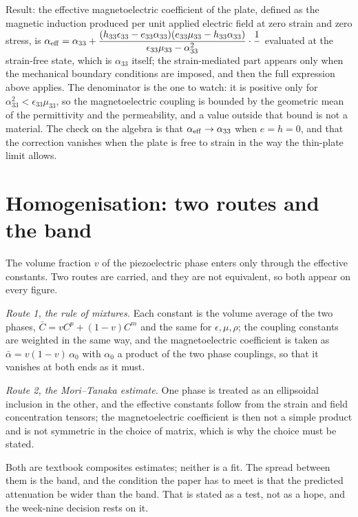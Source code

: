 \documentclass[11pt]{article}
\makeatletter
\newif\ifshowworked
\newenvironment{worked}{%
  \ifshowworked\par\smallskip\noindent\textit{Working.}\par\smallskip\else
  \setbox\z@\vbox\bgroup\fi}{\ifshowworked\par\smallskip\else\egroup\fi}
\makeatother
\begin{document}
\begin{worked}
Result: the effective magnetoelectric coefficient of the plate, defined as the magnetic induction produced
per unit applied electric field at zero strain and zero stress, is
$\alpha_{\rm eff}=\alpha_{33}+\dfrac{(h_{33}\epsilon_{33}-e_{33}\alpha_{33})(e_{33}\mu_{33}-h_{33}\alpha_{33})}
{\epsilon_{33}\mu_{33}-\alpha_{33}^2}\cdot\dfrac{1}{\ }$ evaluated at the strain-free state, which is
$\alpha_{33}$ itself; the strain-mediated part appears only when the mechanical boundary conditions are
imposed, and then the full expression above applies. The denominator is the one to watch: it is positive
only for $\alpha_{33}^2<\epsilon_{33}\mu_{33}$, so the magnetoelectric coupling is bounded by the
geometric mean of the permittivity and the permeability, and a value outside that bound is not a material.
The check on the algebra is that $\alpha_{\rm eff}\to\alpha_{33}$ when $e=h=0$, and that the correction
vanishes when the plate is free to strain in the way the thin-plate limit allows.
\end{worked}

\section{Homogenisation: two routes and the band}\label{sec:homog}

The volume fraction $v$ of the piezoelectric phase enters only through the effective constants. Two routes
are carried, and they are not equivalent, so both appear on every figure.

\emph{Route 1, the rule of mixtures.} Each constant is the volume average of the two phases,
$\bar C=vC^{p}+(1-v)C^{m}$ and the same for $\epsilon,\mu,\rho$; the coupling constants are weighted in the
same way, and the magnetoelectric coefficient is taken as
$\bar\alpha=v(1-v)\,\alpha_{0}$ with $\alpha_0$ a product of the two phase couplings, so that it vanishes
at both ends as it must.

\emph{Route 2, the Mori--Tanaka estimate.} One phase is treated as an ellipsoidal inclusion in the other,
and the effective constants follow from the strain and field concentration tensors; the magnetoelectric
coefficient is then not a simple product and is not symmetric in the choice of matrix, which is why the
choice must be stated.

Both are textbook composites estimates; neither is a fit. The spread between them is the band, and the
condition the paper has to meet is that the predicted attenuation be wider than the band. That is stated as
a test, not as a hope, and the week-nine decision rests on it.
\end{document}
